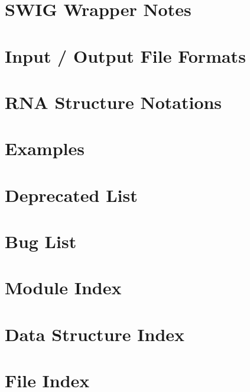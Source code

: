 \documentclass[twoside]{book}
\newcommand{\+}{\discretionary{\mbox{\scriptsize$\hookleftarrow$}}{}{}}
\begin{document}
\chapter{S\+W\+IG Wrapper Notes}
\label{wrappers}

\chapter{Input / Output File Formats}
\label{file_formats}

\chapter{R\+NA Structure Notations}
\label{rna_structure_notations}

\chapter{Examples}
\label{mp_example}

\chapter{Deprecated List}
\label{deprecated}

\chapter{Bug List}
\label{bug}

\chapter{Module Index}

\chapter{Data Structure Index}

\chapter{File Index}

\end{document}

